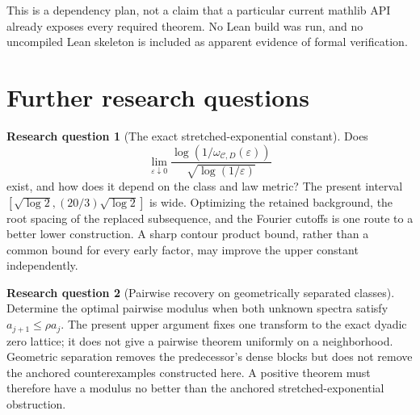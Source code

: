 \documentclass[11pt,a4paper]{article}
\numberwithin{equation}{section}
\theoremstyle{definition}
\newtheorem{question}{Research question}
\theoremstyle{remark}
\newcommand{\eps}{\varepsilon}
\begin{document}
This is a dependency plan, not a claim that a particular current mathlib API
already exposes every required theorem. No Lean build was run, and no uncompiled
Lean skeleton is included as apparent evidence of formal verification.

\section{Further research questions}
\label{sec:further}

\begin{question}[The exact stretched-exponential constant]
Does
\[
 \lim_{\eps\downarrow0}
 \frac{\log(1/\omega_{\mathcal C,D}(\eps))}
      {\sqrt{\log(1/\eps)}}
\]
exist, and how does it depend on the class and law metric? The present interval
$[\sqrt{\log2},(20/3)\sqrt{\log2}]$ is wide. Optimizing the retained
background, the root spacing of the replaced subsequence, and the Fourier
cutoffs is one route to a better lower construction. A sharp contour product
bound, rather than a common bound for every early factor, may improve the
upper constant independently.
\end{question}

\begin{question}[Pairwise recovery on geometrically separated classes]
Determine the optimal pairwise modulus when both unknown spectra satisfy
$a_{j+1}\le\rho a_j$. The present upper argument fixes one transform to
the exact dyadic zero lattice; it does not give a pairwise theorem uniformly
on a neighborhood. Geometric separation removes the predecessor's dense
blocks but does not remove the anchored counterexamples constructed here.
A positive theorem must therefore have a modulus no better than the anchored
stretched-exponential obstruction.
\end{question}
\end{document}
